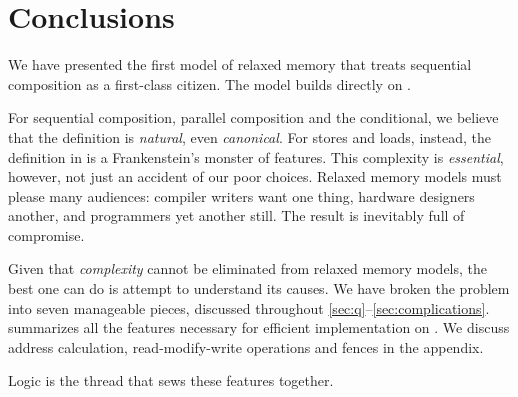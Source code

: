 \section{Conclusions}

We have presented the first model of relaxed memory that treats sequential
composition as a first-class citizen. The model builds directly on \jjr{}.

For sequential composition, parallel composition and the conditional, we
believe that the definition is \emph{natural}, even \emph{canonical}.
For stores and loads, instead, the definition in  is a
Frankenstein's monster of features.  This complexity is \emph{essential},
however, not just an accident of our poor choices.  Relaxed memory models must
please many audiences: compiler writers want one thing, hardware designers
another, and programmers yet another still.  The result is inevitably full of
compromise.

Given that \emph{complexity} cannot be eliminated from relaxed memory models,
the best one can do is attempt to understand its causes.  We have broken the
problem into seven manageable pieces, discussed throughout
\textsection\ref{sec:q}--\ref{sec:complications}.  
summarizes all the features necessary for efficient implementation on
\armeight{}.  We discuss address calculation, read-modify-write operations
and fences in the appendix.

{Logic} is the thread that sews these features together.




